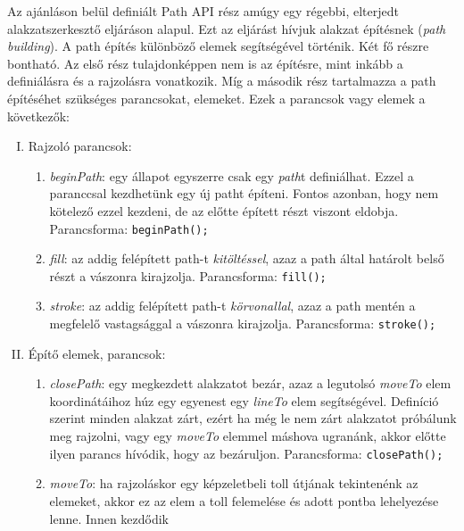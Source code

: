 \documentclass[12pt]{report}
\theoremstyle{definition}
\newcommand{\inenglish}[1]{\textsl{#1}}
\begin{document}
  Az ajánláson belül definiált Path API rész amúgy egy régebbi,
elterjedt alakzatszerkesztő eljáráson alapul. Ezt az eljárást hívjuk
alakzat építésnek (\inenglish{path building}). A path építés különböző
elemek segítségével történik. Két fő részre bontható. Az első rész
tulajdonképpen nem is az építésre, mint inkább a definiálásra és a
rajzolásra vonatkozik. Míg a második rész tartalmazza a path építéséhet
szükséges parancsokat, elemeket. Ezek a parancsok vagy elemek a
következők:

\begin{enumerate}[I.]
  \item Rajzoló parancsok:
    \begin{enumerate}
      \item \emph{beginPath}: egy állapot egyszerre csak egy
      \emph{path}t definiálhat. Ezzel a paranccsal kezdhetünk egy új
      patht építeni. Fontos azonban, hogy nem kötelező ezzel
      kezdeni, de az előtte épített részt viszont eldobja.
      Parancsforma:\newline
        \texttt{beginPath();}
      \item \emph{fill}: az addig felépített path-t
      \emph{kitöltéssel}, azaz a path által határolt belső részt
      a vászonra kirajzolja. Parancsforma:\newline
        \texttt{fill();}
      \item \emph{stroke}: az addig felépített path-t
      \emph{körvonallal}, azaz a path mentén a megfelelő
      vastagsággal a vászonra kirajzolja. Parancsforma:\newline
        \texttt{stroke();}
    \end{enumerate}
  \item Építő elemek, parancsok:
    \begin{enumerate}
      \item \emph{closePath}: egy megkezdett alakzatot bezár, azaz
      a legutolsó \emph{moveTo} elem koordinátáihoz húz egy
      egyenest egy \emph{lineTo} elem segítségével. Definíció
      szerint minden alakzat zárt, ezért ha még le nem zárt
      alakzatot próbálunk meg rajzolni, vagy egy \emph{moveTo}
      elemmel máshova ugranánk, akkor előtte ilyen parancs
      hívódik, hogy az bezáruljon.
      Parancsforma:\newline
        \texttt{closePath();}
      \item \emph{moveTo}: ha rajzoláskor egy képzeletbeli toll
      útjának tekintenénk az elemeket, akkor ez az elem a toll
      felemelése és adott pontba lehelyezése lenne. Innen kezdődik

\end{enumerate}
\end{enumerate}
\end{document}
